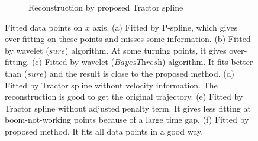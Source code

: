 \begin{figure}
\begin{subfigure}{0.45\textwidth}
    \caption{Reconstruction by proposed Tractor spline}
    \end{subfigure}
 \caption{Fitted data points on $x$ axis. (a) Fitted by P-spline, which gives over-fitting on these points and misses some information. (b) Fitted by wavelet ($\textit{sure}$) algorithm. At some turning points, it gives over-fitting. (c) Fitted by wavelet ($\textit{BayesThresh}$) algorithm. It fits better than ($\textit{sure}$) and the result is close to the proposed method. (d) Fitted by Tractor spline without velocity information. The reconstruction is good to get the original trajectory. (e) Fitted by Tractor spline without adjusted penalty term. It gives less fitting at boom-not-working points because of a large time gap. (f) Fitted by proposed method. It fits all data points in a good way.}\label{1dx}
 \end{figure}





